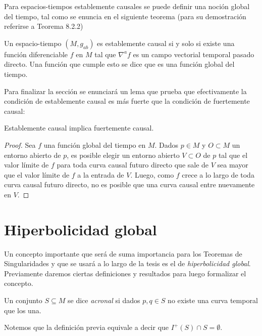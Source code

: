 Para espacios-tiempos establemente causales se puede definir una noción global del tiempo, tal como se enuncia en el siguiente teorema (para su demostración referirse a \citep{1984ucp..book.....W} Teorema 8.2.2)

\begin{theorem}
Un espacio-tiempo $(M,g_{ab})$ es establemente causal si y solo si existe una función diferenciable $f$ en $M$ tal que $\nabla^af$ es un campo vectorial temporal pasado directo. Una función que cumple esto se dice que es una función global del tiempo.
\end{theorem}


Para finalizar la sección se enunciará un lema que prueba que efectivamente la condición de establemente causal es más fuerte que la condición de fuertemente causal:

\begin{lemma}
Establemente causal implica fuertemente causal.
\end{lemma}
\begin{proof}
Sea $f$ una función global del tiempo en $M$. Dados $p\in M$ y $O\subset M$ un entorno abierto de $p$, es posible elegir un entorno abierto $V\subset O$ de $p$ tal que el valor límite de $f$ para toda curva causal futuro directo que sale de $V$ sea mayor que el valor límite de $f$ a la entrada de $V$. Luego, como $f$ crece a lo largo de toda curva causal futuro directo, no es posible que una curva causal entre nuevamente en $V$.
\end{proof}




    
    

\section{Hiperbolicidad global}%

Un concepto importante que será de suma importancia para los Teoremas de Singularidades y que se usará a lo largo de la tesis es el de \textit{hiperbolicidad global}. Previamente daremos ciertas definiciones y resultados para luego formalizar el concepto.

\begin{definition}
Un conjunto $S\subseteq M$ se dice \textit{acronal} si dados $p,q\in S$ no existe una curva temporal que los una.
\end{definition}

Notemos que la definición previa equivale a decir que $I^+(S)\cap S=\emptyset$.

